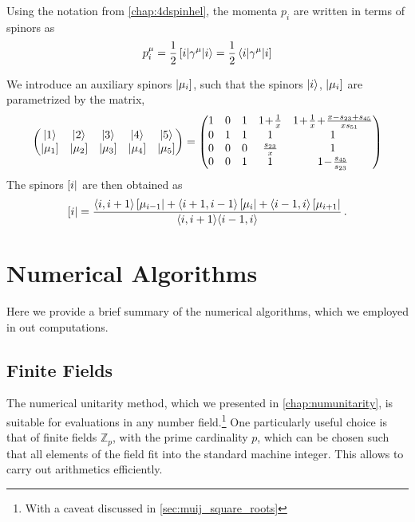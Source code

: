 Using the notation from \cref{chap:4dspinhel}, the momenta $p_i$ are written in terms of spinors as
\begin{equation}
  p^\mu_i = \frac{1}{2}\sbraket(i,\gamma^\mu,i) = \frac{1}{2}\brasket(i,\gamma^\mu,i)
\end{equation}

We introduce an auxiliary spinors $\left\vert \mu_i \right]$,
such that the spinors $\ket{i}$, $\left\vert \mu_i \right]$ are parametrized by the matrix,
\begin{equation}
  \begin{pmatrix}
    \ket{1} &  \ket{2} &   \ket{3} &   \ket{4} &  
    \ket{5} \\   
    \sket{\mu_1} &  
    \sket{\mu_2} &  
    \sket{\mu_3} &  
    \sket{\mu_4} &  
    \sket{\mu_5} 
  \end{pmatrix}
  =
  \begin{pmatrix}
    1 & 0 & 1 & 1 \!+\! \frac{1}{x}  &  1 \!+\! \frac{1}{x} \!+\! \frac{x-s_{23}+s_{45}}{x s_{51}}\\
    0 & 1 & 1 & 1                    &  1\\
    0 & 0 & 0 & \frac{s_{23}}{x}     &  1\\
    0 & 0 & 1 & 1                    & 1 \!-\! \frac{s_{45}}{s_{23}}
  \end{pmatrix}
  \label{eq:TwistorParametrization}
\end{equation}
%
The spinors $\left[ i \right\vert$ are then obtained as
\begin{equation}
\left[ i \right\vert = \frac{\langle i, i+1 \rangle \left[ \mu_{i-1} \right\vert + \langle i+1, i-1\rangle \left[ \mu_{i} \right\vert + \langle i-1, i \rangle\left[ \mu_{i+1} \right\vert}{\langle i, i+1\rangle \langle i-1, i\rangle}\, .
\end{equation}





\chapter{Numerical Algorithms}

Here we provide a brief summary of the numerical algorithms, which we employed in out computations.


\section{Finite Fields}
\label{sec:ff_fp}

The numerical unitarity method, which we presented in \cref{chap:numunitarity}, is suitable 
for evaluations in any number field.\footnote{
  With a caveat discussed in \cref{sec:muij_square_roots}
}
One particularly useful choice is that of finite fields $\mathbb{Z}_p$, with the prime cardinality $p$,
which  can be chosen such that all elements of the field fit into the standard machine integer.
This allows to carry out arithmetics efficiently.

